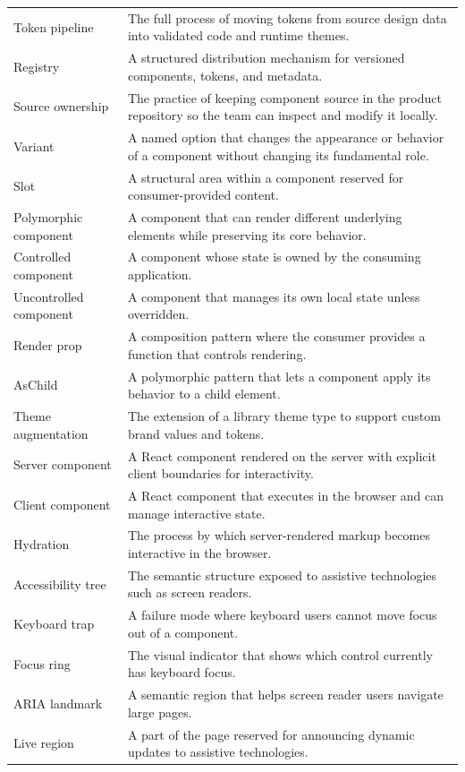 \begin{longtable}{@{}p{}p{}@{}}
Token pipeline & The full process of moving tokens from source design data into validated code and runtime themes. \\
Registry & A structured distribution mechanism for versioned components, tokens, and metadata. \\
Source ownership & The practice of keeping component source in the product repository so the team can inspect and modify it locally. \\
Variant & A named option that changes the appearance or behavior of a component without changing its fundamental role. \\
Slot & A structural area within a component reserved for consumer-provided content. \\
Polymorphic component & A component that can render different underlying elements while preserving its core behavior. \\
Controlled component & A component whose state is owned by the consuming application. \\
Uncontrolled component & A component that manages its own local state unless overridden. \\
Render prop & A composition pattern where the consumer provides a function that controls rendering. \\
AsChild & A polymorphic pattern that lets a component apply its behavior to a child element. \\
Theme augmentation & The extension of a library theme type to support custom brand values and tokens. \\
Server component & A React component rendered on the server with explicit client boundaries for interactivity. \\
Client component & A React component that executes in the browser and can manage interactive state. \\
Hydration & The process by which server-rendered markup becomes interactive in the browser. \\
Accessibility tree & The semantic structure exposed to assistive technologies such as screen readers. \\
Keyboard trap & A failure mode where keyboard users cannot move focus out of a component. \\
Focus ring & The visual indicator that shows which control currently has keyboard focus. \\
ARIA landmark & A semantic region that helps screen reader users navigate large pages. \\
Live region & A part of the page reserved for announcing dynamic updates to assistive technologies. \\

\end{longtable}
